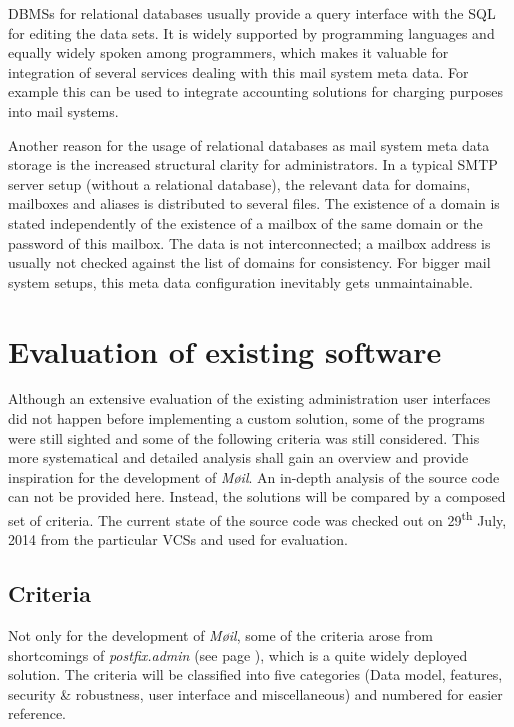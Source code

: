 \documentclass[12pt,a4paper]{scrartcl}
\begin{document}

		\acp{DBMS} for relational databases usually provide a query interface
		with the \ac{SQL} \cite{sql} for editing the data sets. It is widely
		supported by programming languages and equally widely spoken among
		programmers, which makes it valuable for integration of several
		services dealing with this mail system meta data. For example this can
		be used to integrate accounting solutions for charging purposes into
		mail systems.


		Another reason for the usage of relational databases as mail system
		meta data storage is the increased structural clarity for
		administrators. In a typical \acs{SMTP} \cite{smtp} server setup
		(without a relational database), the relevant data for domains,
		mailboxes and aliases is distributed to several files. The existence of
		a domain is stated independently of the existence of a mailbox of the
		same domain or the password of this mailbox. The data is not
		interconnected; a mailbox address is usually not checked against the
		list of domains for consistency. For bigger mail system setups, this
		meta data configuration inevitably gets unmaintainable.

	\section*{Evaluation of existing software}

		Although an extensive evaluation of the existing administration user
		interfaces did not happen before implementing a custom solution, some
		of the programs were still sighted and some of the following criteria
		was still considered. This more systematical and detailed analysis
		shall gain an overview and provide inspiration for the development of
		\emph{Møil}. An in-depth analysis of the source code can not be
		provided here. Instead, the solutions will be compared by a composed
		set of criteria. The current state of the source code was checked out
		on 29\textsuperscript{th} July, 2014 from the particular \acp{VCS} and
		used for evaluation.

		\subsection*{Criteria}
		\label{sec:evaluation:criteria}
			Not only for the development of \emph{Møil}, some of the criteria
			arose from shortcomings of \emph{postfix.admin} (see page
			\pageref{sec:contestants:postfix.admin}), which is a quite widely
			deployed solution. The criteria will be classified into five
			categories (Data model, features, security \& robustness, user
			interface and miscellaneous) and numbered for easier reference.
\end{document}
